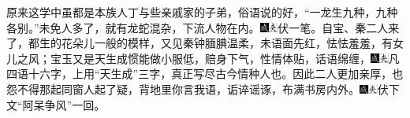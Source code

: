 原来这学中虽都是本族人丁与些亲戚家的子弟，俗语说的好，``一龙生九种，九种各别。''未免人多了，就有龙蛇混杂，下流人物在内。{\includegraphics[width=3mm]{../Images/00005}\includegraphics[width=3mm]{../Images/00012}\footnotesize \kaishu 伏一笔。}自宝、秦二人来了，都生的花朵儿一般的模样，又见秦钟腼腆温柔，未语面先红，怯怯羞羞，有女儿之风；宝玉又是天生成惯能做小服低，赔身下气，性情体贴，话语绵缠，{\includegraphics[width=3mm]{../Images/00005}\includegraphics[width=3mm]{../Images/00012}\footnotesize \kaishu 凡四语十六字，上用``天生成''三字，真正写尽古今情种人也。}因此二人更加亲厚，也怨不得那起同窗人起了疑，背地里你言我语，诟谇谣诼，布满书房内外。{\includegraphics[width=3mm]{../Images/00005}\includegraphics[width=3mm]{../Images/00012}\footnotesize \kaishu 伏下文``阿呆争风''一回。}

